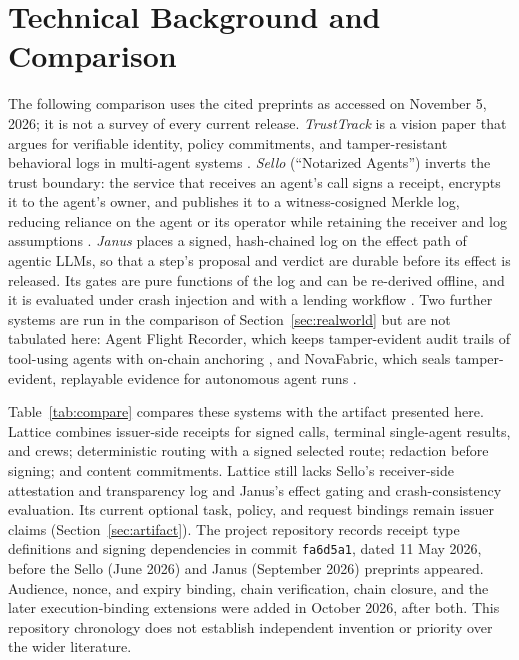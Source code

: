 \section{Technical Background and Comparison}\label{app:technical-background}

The following comparison uses the cited preprints as accessed on November 5, 2026; it is not a survey of every current release. \emph{TrustTrack} is a vision paper that argues for verifiable identity, policy commitments, and tamper-resistant behavioral logs in multi-agent systems \citep{li2025trusttrack}. \emph{Sello} (``Notarized Agents'') inverts the trust boundary: the service that receives an agent's call signs a receipt, encrypts it to the agent's owner, and publishes it to a witness-cosigned Merkle log, reducing reliance on the agent or its operator while retaining the receiver and log assumptions \citep{figuera2026sello}. \emph{Janus} places a signed, hash-chained log on the effect path of agentic LLMs, so that a step's proposal and verdict are durable before its effect is released. Its gates are pure functions of the log and can be re-derived offline, and it is evaluated under crash injection and with a lending workflow \citep{arslan2026janus}. Two further systems are run in the comparison of Section~\ref{sec:realworld} but are not tabulated here: Agent Flight Recorder, which keeps tamper-evident audit trails of tool-using agents with on-chain anchoring \citep{bindschaedler2026afr}, and NovaFabric, which seals tamper-evident, replayable evidence for autonomous agent runs \citep{ardebili2026novafabric}.

Table~\ref{tab:compare} compares these systems with the artifact presented here. Lattice combines issuer-side receipts for signed calls, terminal single-agent results, and crews; deterministic routing with a signed selected route; redaction before signing; and content commitments. Lattice still lacks Sello's receiver-side attestation and transparency log and Janus's effect gating and crash-consistency evaluation. Its current optional task, policy, and request bindings remain issuer claims (Section~\ref{sec:artifact}). The project repository records receipt type definitions and signing dependencies \citep{lattice} in commit \texttt{fa6d5a1}, dated 11 May 2026, before the Sello (June 2026) and Janus (September 2026) preprints appeared. Audience, nonce, and expiry binding, chain verification, chain closure, and the later execution-binding extensions were added in October 2026, after both. This repository chronology does not establish independent invention or priority over the wider literature.


